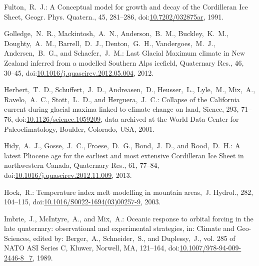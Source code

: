 \documentclass[tc, manuscript]{copernicus}
\begin{document}
\begin{thebibliography}{114}
Fulton,~R.~J.: A Conceptual model for growth and decay of the Cordilleran Ice Sheet, G{e}ogr. Phys. Quatern., 45, 281--286,
doi:\href{http://dx.doi.org/10.7202/032875ar}{10.7202/032875ar}, 1991.


Golledge,~N.~R., Mackintosh,~A.~N., Anderson,~B.~M., Buckley,~K.~M., Doughty,~A.~M., Barrell,~D.~J., Denton,~G.~H., Vandergoes,~M.~J., Andersen,~B.~G., and Schaefer,~J.~M.: Last Glacial Maximum climate in {N}ew {Z}ealand inferred from a modelled {S}outhern {A}lps icefield, Quaternary Res., 46, 30--45,
doi:\href{http://dx.doi.org/10.1016/j.quascirev.2012.05.004}{10.1016/j.quascirev.2012.05.004}, 2012.


Herbert,~T.~D., Schuffert,~J.~D., Andreasen,~D., Heusser,~L., Lyle,~M., Mix,~A., Ravelo,~A.~C., Stott,~L.~D., and Herguera,~J.~C.: Collapse of the California current during glacial maxima linked to climate change on land, Sience, 293, 71--76,
doi:\href{http://dx.doi.org/10.1126/science.1059209}{10.1126/science.1059209}, data archived at the World Data Center for Paleoclimatology, Boulder, Colorado, USA, 2001.


Hidy,~A.~J., Gosse,~J.~C., Froese,~D.~G., Bond,~J.~D., and Rood,~D.~H.: A latest Pliocene age for the earliest and most extensive Cordilleran Ice Sheet in northwestern Canada, Quaternary Res., 61, 77--84,
doi:\href{http://dx.doi.org/10.1016/j.quascirev.2012.11.009}{10.1016/j.quascirev.2012.11.009}, 2013.


Hock,~R.: Temperature index melt modelling in mountain areas,~J. Hydrol., 282, 104--115,
doi:\href{http://dx.doi.org/10.1016/S0022-1694(03)00257-9}{10.1016/S0022-1694(03)00257-9}, 2003.


Imbrie,~J., McIntyre,~A., and Mix,~A.: Oceanic response to orbital forcing in the late quaternary: observational and experimental strategies, in: Climate and Geo-Sciences, edited by: Berger,~A., Schneider,~S., and Duplessy,~J., vol. 285 of NATO ASI Series C, Kluwer, Norwell, MA, 121--164,
doi:\href{http://dx.doi.org/10.1007/978-94-009-2446-8_7}{10.1007/978-94-009-2446-8\_7}, 1989.



\end{thebibliography}
\end{document}
